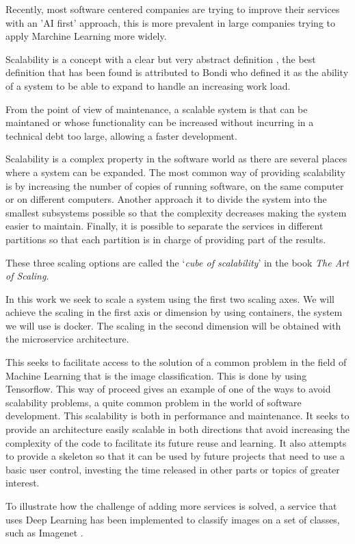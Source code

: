 Recently, most software centered companies are trying to improve their services with an 'AI first' approach, this is more prevalent in large companies trying to apply Marchine Learning more widely. 

Scalability is a concept with a clear but very abstract definition \cite{hill90}, the best definition that has been found is attributed to Bondi \cite{bondi00} who defined it as the ability of a system to be able to expand to handle an increasing work load. 

From the point of view of maintenance, a scalable system is that can be maintaned or whose functionality can be increased without incurring in a technical debt too large, allowing a faster development. 

Scalability is a complex property in the software world as there are several places where a system can be expanded. The most common way of providing scalability is by increasing the number of copies of running software, on the same computer or on different computers. Another approach it to divide the system into the smallest subsystems possible so that the complexity decreases making the system easier to maintain. Finally, it is possible to separate the services in different partitions so that each partition is in charge of providing part of the results.

These three scaling options are called the `\emph{cube of scalability}' in the book \emph{The Art of Scaling}\cite{scala09}. 

In this work we seek to scale a system using the first two scaling axes. We will achieve the scaling in the first axis or dimension by using containers, the system we will use is docker. The scaling in the second dimension will be obtained with the microservice architecture.

This seeks to facilitate access to the solution of a common problem in the field of Machine Learning that is the image classification. This is done by using Tensorflow. This way of proceed gives an example of one of the ways to avoid scalability problems, a quite common problem in the world of software development. This scalability is both in performance and maintenance. It seeks to provide an architecture easily scalable in both directions that avoid increasing the complexity of the code to facilitate its future reuse and learning. It also attempts to provide a skeleton so that it can be used by future projects that need to use a basic user control, investing the time released in other parts or topics of greater interest. 

To illustrate how the challenge of adding more services is solved, a service that uses Deep Learning has been implemented to classify images on a set of classes, such as Imagenet \cite{imnet}. 
